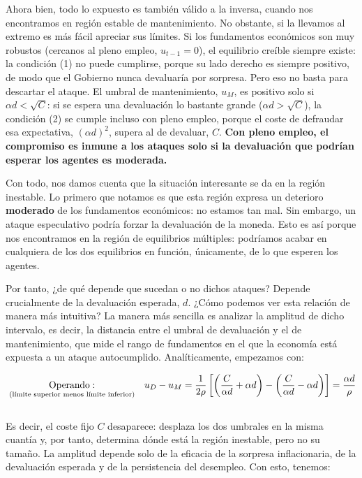 \documentclass[10pt,a4paper]{article}
\begin{document}
Ahora bien, todo lo expuesto es también válido a la inversa, cuando nos encontramos en región estable de mantenimiento. No obstante, si la llevamos al extremo es más fácil apreciar sus límites. Si los fundamentos económicos son muy robustos (cercanos al pleno empleo, $u_{t-1}=0$), el equilibrio creíble siempre existe: la condición (1) no puede cumplirse, porque su lado derecho es siempre positivo, de modo que el Gobierno nunca devaluaría por sorpresa. Pero eso no basta para descartar el ataque. El umbral de mantenimiento, $u_M$, es positivo solo si $\alpha d<\sqrt{C}$: si se espera una devaluación lo bastante grande ($\alpha d>\sqrt{C}$), la condición (2) se cumple incluso con pleno empleo, porque el coste de defraudar esa expectativa, $(\alpha d)^2$, supera al de devaluar, $C$. \textbf{Con pleno empleo, el compromiso es inmune a los ataques solo si la devaluación que podrían esperar los agentes es moderada.}

Con todo, nos damos cuenta que la situación interesante se da en la región inestable. Lo primero que notamos es que esta región expresa un deterioro \textbf{moderado} de los fundamentos económicos: no estamos tan mal. Sin embargo, un ataque especulativo podría forzar la devaluación de la moneda. Esto es así porque nos encontramos en la región de equilibrios múltiples: podríamos acabar en cualquiera de los dos equilibrios en función, únicamente, de lo que esperen los agentes.

Por tanto, ¿de qué depende que sucedan o no dichos ataques? Depende crucialmente de la devaluación esperada, $d$. ¿Cómo podemos ver esta relación de manera más intuitiva? La manera más sencilla es analizar la amplitud de dicho intervalo, es decir, la distancia entre el umbral de devaluación y el de mantenimiento, que mide el rango de fundamentos en el que la economía está expuesta a un ataque autocumplido. Analíticamente, empezamos con:

$$\begin{aligned}
  &\underset{\text{\scriptsize (límite superior menos límite inferior)}}{\text{Operando}:}&&u_D-u_M=\frac{1}{2\rho}\left[\left(\frac{C}{\alpha d}+\alpha d\right)-\left(\frac{C}{\alpha d}-\alpha d\right)\right]=\frac{\alpha d}{\rho}\\[1em]
\end{aligned}$$

Es decir, el coste fijo $C$ desaparece: desplaza los dos umbrales en la misma cuantía y, por tanto, determina dónde está la región inestable, pero no su tamaño. La amplitud depende solo de la eficacia de la sorpresa inflacionaria, de la devaluación esperada y de la persistencia del desempleo. Con esto, tenemos:
\end{document}
